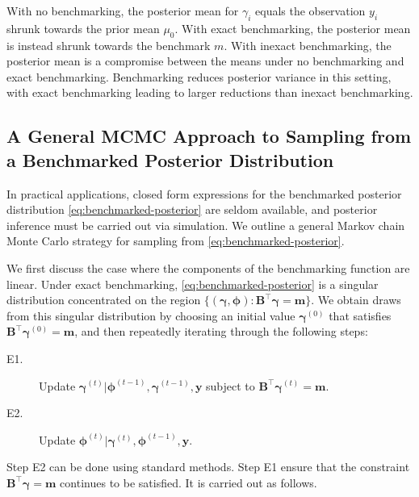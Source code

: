 \documentclass[12pt]{article}
\begin{document}
With no benchmarking, the posterior mean for $\gamma_i$ equals the observation $y_i$ shrunk towards the prior mean $\mu_0$.  With exact benchmarking, the posterior mean is instead shrunk towards the benchmark $m$.  With inexact benchmarking, the posterior mean is a compromise between the means under no benchmarking and exact benchmarking. Benchmarking reduces posterior variance in this setting, with exact benchmarking leading to larger reductions than inexact benchmarking.


\subsection{A General MCMC Approach to Sampling from a Benchmarked Posterior Distribution}
  \label{sec:general_algorithm}

In practical applications, closed form expressions for the benchmarked posterior distribution \eqref{eq:benchmarked-posterior} are seldom available, and posterior inference must be carried out via simulation.  We outline a general Markov chain Monte Carlo strategy for sampling from \eqref{eq:benchmarked-posterior}.

We first discuss the case where the components of the benchmarking function are linear.  Under exact benchmarking, \eqref{eq:benchmarked-posterior} is a singular distribution concentrated on the region $\{(\bm{\gamma},\bm{\phi}): \bm{B}^{\top}\bm{\gamma}=\bm{m}\}$.  We obtain draws from this singular distribution by choosing an initial value $\bm{\gamma}^{(0)}$ that satisfies $\bm{B}^{\top} \bm{\gamma}^{(0)} = \bm{m}$, and then repeatedly iterating through the following steps:
\begin{description}
  \item[E1.] Update $\bm{\gamma}^{(t)}|\bm{\phi}^{(t-1)},\bm{\gamma}^{(t-1)},\bm{y}$ subject to $\bm{B}^{\top} \bm{\gamma}^{(t)} = \bm{m}$.
  \item[E2.] Update $\bm{\phi}^{(t)}|\bm{\gamma}^{(t)},\bm{\phi}^{(t-1)},\bm{y}$.
\end{description}
Step E2 can be done using standard methods.   Step E1 ensure that the constraint $\bm{B}^{\top}\bm{\gamma}=\bm{m}$ continues to be satisfied.  It is carried out as follows.
\end{document}
